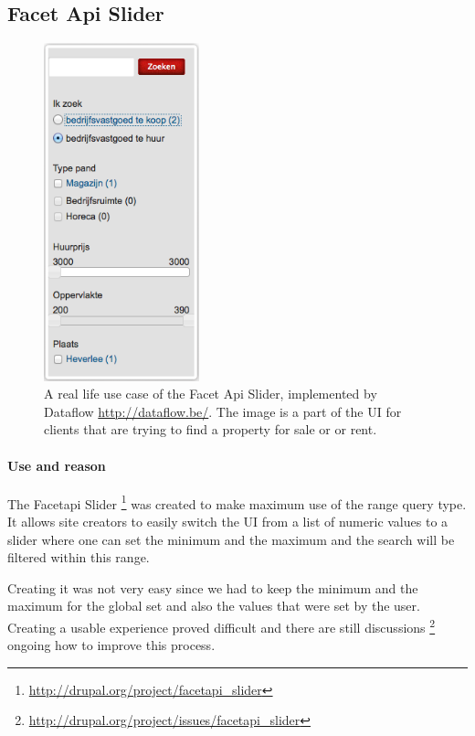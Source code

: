 \subsection{Facet Api Slider}
\begin{figure}
\begin{center}
     \includegraphics[width=0.4\textwidth]{images/implementation/facetapi_dataflow.png}
     \caption{A real life use case of the Facet Api Slider, implemented by Dataflow \url{http://dataflow.be/}. The image is a part of the UI for clients that are trying to find a property for sale or or rent.}
\end{center}
\end{figure}
\paragraph{Use and reason}
The Facetapi Slider \footnote{\url{http://drupal.org/project/facetapi_slider}} was created to make maximum use of the range query type. It allows site creators to easily switch the UI from a list of numeric values to a slider where one can set the minimum and the maximum and the search will be filtered within this range. 

Creating it was not very easy since we had to keep the minimum and the maximum for the global set and also the values that were set by the user. Creating a usable experience proved difficult and there are still discussions \footnote{\url{http://drupal.org/project/issues/facetapi_slider}} ongoing how to improve this process. 

